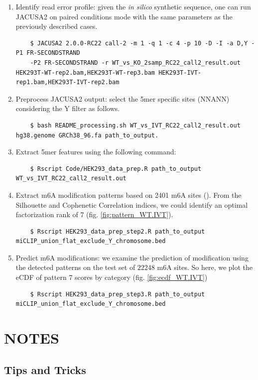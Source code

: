 \documentclass[times, 11pt, a4paper]{article}
\begin{document}
\begin{enumerate}
	\item Identify read error profile: given the \emph{in silico} synthetic sequence, one can run JACUSA2 on paired conditions mode with the same parameters as the previously described cases. 
	\begin{verbatim}
	$ JACUSA2 2.0.0-RC22 call-2 -m 1 -q 1 -c 4 -p 10 -D -I -a D,Y -P1 FR-SECONDSTRAND
	-P2 FR-SECONDSTRAND -r WT_vs_KO_2samp_RC22_call2_result.out HEK293T-WT-rep2.bam,HEK293T-WT-rep3.bam	HEK293T-IVT-rep1.bam,HEK293T-IVT-rep2.bam
	\end{verbatim}
	\item Preprocess JACUSA2 output: select the 5mer specific sites (NNANN) considering the Y filter as follows. 
		\begin{verbatim} 
	$ bash README_processing.sh WT_vs_IVT_RC22_call2_result.out hg38.genome GRCh38_96.fa path_to_output.
	\end{verbatim}
	\item Extract 5mer features using the following command:
		\begin{verbatim} 
	$ Rscript Code/HEK293_data_prep.R path_to_output WT_vs_IVT_RC22_call2_result.out
	\end{verbatim}
	\item Extract m6A modification patterns based on 2401 m6A sites (). From the Silhouette and Cophenetic Correlation indices, we could identify an optimal factorization rank of 7 (fig. \ref{fig:pattern_WT.IVT}).
		\begin{verbatim} 
	$ Rscript HEK293_data_prep_step2.R path_to_output miCLIP_union_flat_exclude_Y_chromosome.bed
	\end{verbatim} 
	\item Predict m6A modifications: we examine the prediction of modification using the detected patterns on the test set of $22248$ m6A sites. So here, we plot the eCDF of pattern 7 scores by category (fig. \ref{fig:ecdf_WT.IVT})
		\begin{verbatim} 
	$ Rscript HEK293_data_prep_step3.R path_to_output miCLIP_union_flat_exclude_Y_chromosome.bed
	\end{verbatim} 
	
\end{enumerate}

\section*{NOTES}
\subsection*{Tips and Tricks}
\end{document}
